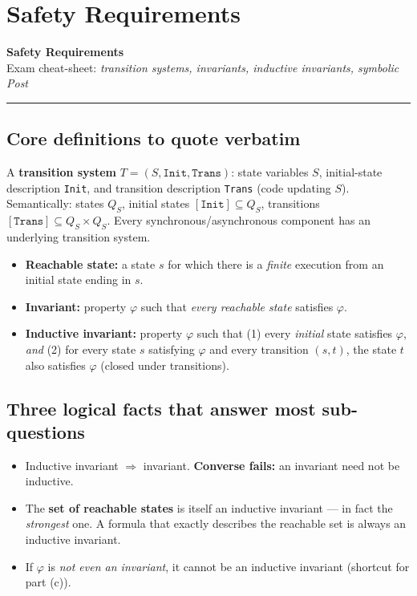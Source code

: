 \chapter{Safety Requirements}

\begin{center}
{\Large\bfseries Safety Requirements}\\[1pt]
{\small Exam cheat-sheet: \emph{transition systems, invariants, inductive invariants, symbolic Post}}
\end{center}
\hrule
\vspace{4pt}

\section{Core definitions to quote verbatim}
A \textbf{transition system} $T=(S,\texttt{Init},\texttt{Trans})$: state variables $S$, initial-state description \texttt{Init}, and transition description \texttt{Trans} (code updating $S$). Semantically: states $Q_S$, initial states $[\texttt{Init}]\subseteq Q_S$, transitions $[\texttt{Trans}]\subseteq Q_S\times Q_S$. Every synchronous/asynchronous component has an underlying transition system.
\begin{itemize}
  \item \textbf{Reachable state:} a state $s$ for which there is a \emph{finite} execution from an initial state ending in $s$.
  \item \textbf{Invariant:} property $\varphi$ such that \emph{every reachable state} satisfies $\varphi$.
  \item \textbf{Inductive invariant:} property $\varphi$ such that (1) every \emph{initial} state satisfies $\varphi$, \emph{and} (2) for every state $s$ satisfying $\varphi$ and every transition $(s,t)$, the state $t$ also satisfies $\varphi$ (closed under transitions).
\end{itemize}

\section{Three logical facts that answer most sub-questions}
\begin{keybox}
\begin{itemize}
  \item Inductive invariant $\Rightarrow$ invariant. \textbf{Converse fails:} an invariant need not be inductive.
  \item The \textbf{set of reachable states} is itself an inductive invariant --- in fact the \emph{strongest} one. A formula that exactly describes the reachable set is always an inductive invariant.
  \item If $\varphi$ is \emph{not even an invariant}, it cannot be an inductive invariant (shortcut for part (c)).
\end{itemize}
\end{keybox}

